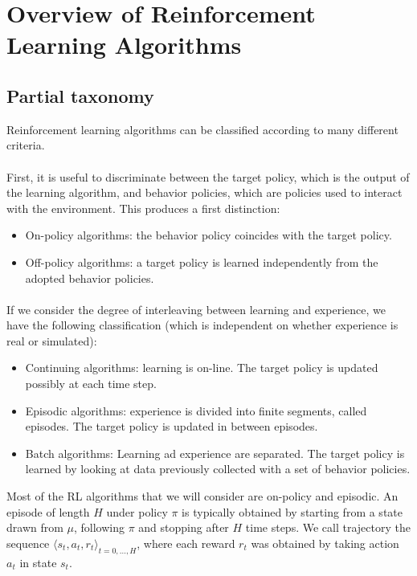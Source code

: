 \section{Overview of Reinforcement Learning Algorithms}\label{sec:overview}

\subsection{Partial taxonomy}
Reinforcement learning algorithms can be classified according to many different criteria.
\paragraph{} %
First, it is useful to discriminate between the target policy, which is the output of the learning algorithm, and behavior policies, which are policies used to interact with the environment. This produces a first distinction:
\begin{itemize}
\item On-policy algorithms: the behavior policy coincides with the target policy.
\item Off-policy algorithms: a target policy is learned independently from the adopted behavior policies. 
\end{itemize}
\paragraph{} %
If we consider the degree of interleaving between learning and experience, we have the following classification (which is independent on whether experience is real or simulated):
\begin{itemize}
\item Continuing algorithms: learning is on-line. The target policy is updated possibly at each time step.
\item Episodic algorithms: experience is divided into finite segments, called episodes. The target policy is updated in between episodes.
\item Batch algorithms: Learning ad experience are separated. The target policy is learned by looking at data previously collected with a set of behavior policies. 
\end{itemize}
Most of the \ac{RL} algorithms that we will consider are on-policy and episodic. An episode of length $H$ under policy $\pi$ is typically obtained by starting from a state drawn from $\mu$, following $\pi$ and stopping after $H$ time steps. We call trajectory the sequence $\langle s_t,a_t,r_t\rangle_{t=0,\dotsc,H}$, where each reward $r_t$ was obtained by taking action $a_t$ in state $s_t$.
